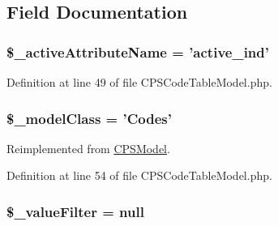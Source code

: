 \subsection{Field Documentation}
\hypertarget{classCPSCodeTableModel_a58d9f8801e4c40d867f28343ff13551e}{
\subsubsection[{\$\_\-activeAttributeName}]{\setlength{\rightskip}{0pt plus 5cm}\$\_\-activeAttributeName = 'active\_\-ind'}}
\label{classCPSCodeTableModel_a58d9f8801e4c40d867f28343ff13551e}


Definition at line 49 of file CPSCodeTableModel.php.

\hypertarget{classCPSCodeTableModel_a90080dcb26627bf719d96ab99e51f958}{
\subsubsection[{\$\_\-modelClass}]{\setlength{\rightskip}{0pt plus 5cm}\$\_\-modelClass = 'Codes'}}
\label{classCPSCodeTableModel_a90080dcb26627bf719d96ab99e51f958}


Reimplemented from \hyperlink{classCPSModel_a90080dcb26627bf719d96ab99e51f958}{CPSModel}.



Definition at line 54 of file CPSCodeTableModel.php.

\hypertarget{classCPSCodeTableModel_a3591a2fc703faa60237846a98b10a8cf}{
\subsubsection[{\$\_\-valueFilter}]{\setlength{\rightskip}{0pt plus 5cm}\$\_\-valueFilter = null}}
\label{classCPSCodeTableModel_a3591a2fc703faa60237846a98b10a8cf}


